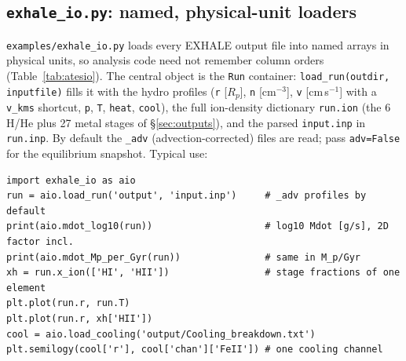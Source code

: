 \documentclass[english,a4paper]{my_memo}
\begin{document}
\subsection{\texttt{exhale\_io.py}: named, physical-unit loaders}
\label{sec:atesio}
\texttt{examples/exhale\_io.py} loads every EXHALE output file into named arrays
in physical units, so analysis code need not remember column orders
(Table~\ref{tab:atesio}). The central object is the \texttt{Run} container:
\texttt{load\_run(outdir, inputfile)} fills it with the hydro profiles
(\texttt{r} [$R_p$], \texttt{n} [cm$^{-3}$], \texttt{v} [cm\,s$^{-1}$] with a
\texttt{v\_kms} shortcut, \texttt{p}, \texttt{T}, \texttt{heat},
\texttt{cool}), the full ion-density dictionary \texttt{run.ion} (the 6 H/He
plus 27 metal stages of \S\ref{sec:outputs}), and the parsed
\texttt{input.inp} in \texttt{run.inp}. By default the \texttt{\_adv}
(advection-corrected) files are read; pass \texttt{adv=False} for the
equilibrium snapshot. Typical use:
\begin{lstlisting}[style=sh]
import exhale_io as aio
run = aio.load_run('output', 'input.inp')     # _adv profiles by default
print(aio.mdot_log10(run))                    # log10 Mdot [g/s], 2D factor incl.
print(aio.mdot_Mp_per_Gyr(run))               # same in M_p/Gyr
xh = run.x_ion(['HI', 'HII'])                 # stage fractions of one element
plt.plot(run.r, run.T)
plt.plot(run.r, xh['HII'])
cool = aio.load_cooling('output/Cooling_breakdown.txt')
plt.semilogy(cool['r'], cool['chan']['FeII']) # one cooling channel
\end{lstlisting}
\end{document}
